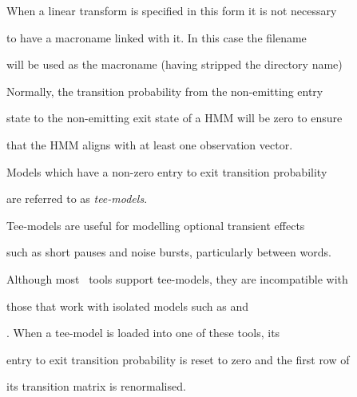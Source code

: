 When a linear transform is specified in this form it is not necessary


to have a macroname linked with it. In this case the filename


will be used as the macroname (having stripped the directory name)










Normally, the transition probability from the non-emitting entry


state to the non-emitting exit state of a HMM will be zero to ensure


that the HMM aligns with at least one observation vector.  


Models which have a non-zero entry to exit transition probability 


are referred to as {\it tee-models}.





Tee-models are useful for modelling optional transient effects


such as short pauses and noise bursts, particularly between words.





Although most \HTK\ tools support tee-models, they are incompatible with


those that work with isolated models such as  and


. When a tee-model is loaded into one of these tools, its


entry to exit transition probability is reset to zero and the first row of


its transition matrix is renormalised.





